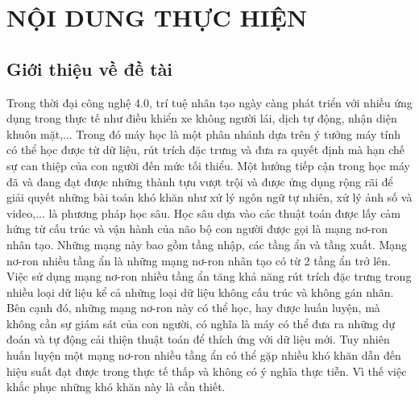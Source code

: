 \documentclass{article}[14pt]
\begin{document}
    \section{NỘI DUNG THỰC HIỆN}
    {

    
    \subsection{Giới thiệu về đề tài}

  Trong thời đại công nghệ 4.0, trí tuệ nhân tạo ngày càng phát triển với nhiều ứng dụng trong thực tế như điều khiển xe không người lái, dịch tự động, nhận diện khuôn mặt,... Trong đó máy học là một phân nhánh dựa trên ý tưởng máy tính có thể học được từ dữ liệu, rút trích đặc trưng và đưa ra quyết định mà hạn chế sự can thiệp của con người đến mức tối thiểu. Một hướng tiếp cận trong học máy đã và đang đạt được những thành tựu vượt trội và được ứng dụng rộng rãi để giải quyết những bài toán khó khăn như xử lý ngôn ngữ tự nhiên, xử lý ảnh số và video,... là phương pháp học sâu. Học sâu dựa vào các thuật toán được lấy cảm hứng từ cấu trúc và vận hành của não bộ con người được gọi là mạng nơ-ron nhân tạo. Những mạng này bao gồm tầng nhập, các tầng ẩn và tầng xuất. Mạng nơ-ron nhiều tầng ẩn là những mạng nơ-ron nhân tạo có từ 2 tầng ẩn trở lên. Việc sử dụng mạng nơ-ron nhiều tầng ẩn tăng khả năng rút trích đặc trưng trong nhiều loại dữ liệu kể cả những loại dữ liệu không cấu trúc và không gán nhãn. Bên cạnh đó, những mạng nơ-ron này có thể học, hay được huấn luyện, mà không cần sự giám sát của con người, có nghĩa là máy có thể đưa ra những dự đoán và tự động cải thiện thuật toán để thích ứng với dữ liệu mới. Tuy nhiên huấn luyện một mạng nơ-ron nhiều tầng ẩn có thể gặp nhiều khó khăn dẫn đến hiệu suất đạt được trong thực tế thấp và không có ý nghĩa thực tiễn. Vì thế việc khắc phục những khó khăn này là cần thiết.  

}
\end{document}
